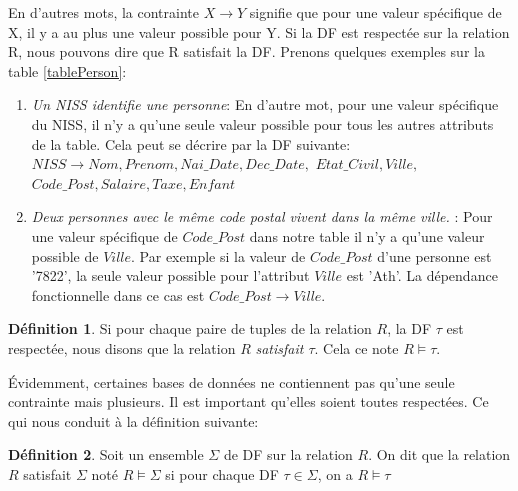 \documentclass[letterpaper, 12pt]{report}
\theoremstyle{definition}
\newtheorem{mydef}{Définition}
\begin{document}
En d'autres mots, la contrainte $X \rightarrow Y$ signifie que pour une valeur spécifique de X, il y a au plus une valeur possible pour Y. Si la DF est respectée sur la relation R, nous pouvons dire que R satisfait la DF. Prenons quelques exemples sur la table \ref{tablePerson}:

\begin{enumerate}
\item \emph{Un NISS identifie une personne}: En d'autre mot, pour une valeur spécifique du NISS, il n'y a qu'une seule valeur possible pour tous les autres attributs de la table. Cela peut se décrire par la DF suivante:
$ NISS \rightarrow Nom, Prenom, Nai\_Date, Dec\_Date,$ $Etat\_Civil, Ville,$ $Code\_Post, Salaire, Taxe, Enfant$
\item \emph{Deux personnes avec le même code postal vivent dans la même ville.} : Pour une valeur spécifique de $Code\_Post$ dans notre table il n'y a qu'une valeur possible de $Ville$. Par exemple si la valeur de $Code\_Post$ d'une personne est '7822', la seule valeur possible pour l'attribut $Ville$ est 'Ath'. La dépendance fonctionnelle dans ce cas est $Code\_Post \rightarrow Ville$.
\end{enumerate}

\begin{mydef}
Si pour chaque paire de tuples de la relation $R$, la DF $\tau$ est respectée, nous disons que la relation $R$ \emph{satisfait $\tau$}. Cela ce note $R \models \tau$.
\end{mydef}

Évidemment, certaines bases de données ne contiennent pas qu'une seule contrainte mais plusieurs. Il est important qu'elles soient toutes respectées. Ce qui nous conduit à la définition suivante:
  
\begin{mydef}
Soit un ensemble $\Sigma$ de DF sur la relation $R$. On dit que la relation $R$ satisfait $\Sigma$ noté $R \models \Sigma$ si pour chaque DF $ \tau \in \Sigma$, on a $R \models \tau$
\end{mydef}
\end{document}
